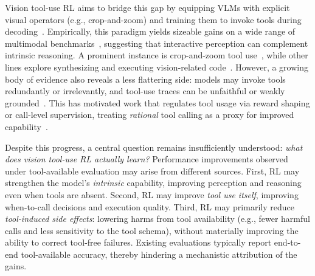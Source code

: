 Vision tool-use RL aims to bridge this gap by equipping VLMs with explicit visual operators (e.g., crop-and-zoom) and training them to invoke tools during decoding~\cite{openaiThinkingWithImages2025,zhangSkyworkR1V4AgenticMultimodal2025,zhouReinforcedVisualPerception2025}.
Empirically, this paradigm yields sizeable gains on a wide range of multimodal benchmarks~\cite{openaiThinkingWithImages2025,zhangSkyworkR1V4AgenticMultimodal2025,zhouReinforcedVisualPerception2025}, suggesting that interactive perception can complement intrinsic reasoning.
A prominent instance is crop-and-zoom tool use~\cite{suPixelReasonerPixelSpace2025,zhengDeepEyesIncentivizingThinking2025,laiMinio3ScalingUp2025,liuHiDeRethinkingZoomIN2025}, while other lines explore synthesizing and executing vision-related code~\cite{zhangThymeThinkBeyond2025,zhao2025pyvisionagenticvisiondynamic}.
However, a growing body of evidence also reveals a less flattering side: models may invoke tools redundantly or irrelevantly, and tool-use traces can be unfaithful or weakly grounded~\cite{yuVFaithLargeMultimodal2025,liuFaithfulnessVisualThinking2025,duRevisitingNecessityLengthy2025}.
This has motivated work that regulates tool usage via reward shaping or call-level supervision, treating \emph{rational} tool calling as a proxy for improved capability~\cite{wangAdaToolerVAdaptiveToolUse2025,wangIllusionIntentionVisual2025,liuFaithfulnessVisualThinking2025}.

Despite this progress, a central question remains insufficiently understood:
\emph{what does vision tool-use RL actually learn?}
Performance improvements observed under tool-available evaluation may arise from different sources.
First, RL may strengthen the model's \emph{intrinsic} capability, improving perception and reasoning even when tools are absent.
Second, RL may improve \emph{tool use itself}, improving when-to-call decisions and execution quality.
%
Third, RL may primarily reduce \emph{tool-induced side effects}: lowering harms from tool availability (e.g., fewer harmful calls and less sensitivity to the tool schema), without materially improving the ability to correct tool-free failures.
%
Existing evaluations typically report end-to-end tool-available accuracy, thereby hindering a mechanistic attribution of the gains.

